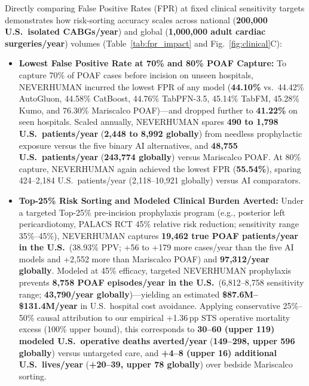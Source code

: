 Directly comparing False Positive Rates (FPR) at fixed clinical sensitivity targets demonstrates how risk-sorting accuracy scales across national (\textbf{200,000 U.S.\ isolated CABGs/year}) and global (\textbf{1,000,000 adult cardiac surgeries/year}\cite{vervoort2023global}) volumes (Table~\ref{tab:fpr_impact} and Fig.~\ref{fig:clinical}C):
\begin{itemize}
  \item \textbf{Lowest False Positive Rate at 70\% and 80\% POAF Capture:} To capture 70\% of POAF cases before incision on unseen hospitals, NEVERHUMAN incurred the lowest FPR of any model (\textbf{44.10\%} vs.\ 44.42\% AutoGluon, 44.58\% CatBoost, 44.76\% TabPFN-3.5, 45.14\% TabFM, 45.28\% Kumo, and 76.30\% Mariscalco POAF)---and dropped further to \textbf{41.22\%} on seen  hospitals. Scaled annually, NEVERHUMAN spares \textbf{490 to 1,798 U.S.\ patients/year} (\textbf{2,448 to 8,992 globally}) from needless prophylactic exposure versus the five binary AI alternatives, and \textbf{48,755 U.S.\ patients/year} (\textbf{243,774 globally}) versus Mariscalco POAF. At 80\% capture, NEVERHUMAN again achieved the lowest FPR (\textbf{55.54\%}), sparing 424--2,184 U.S.\ patients/year (2,118--10,921 globally) versus AI comparators.
  \item \textbf{Top-25\% Risk Sorting and Modeled Clinical Burden Averted:} Under a targeted Top-25\% pre-incision prophylaxis program (e.g., posterior left pericardiotomy, PALACS RCT 45\% relative risk reduction;\cite{gaudino2021palacs} sensitivity range 35\%--45\%), NEVERHUMAN captures \textbf{19,462 true POAF patients/year in the U.S.}\ (38.93\% PPV; +56 to +179 more cases/year than the five AI models and +2,552 more than Mariscalco POAF) and \textbf{97,312/year globally}. Modeled at 45\% efficacy, targeted NEVERHUMAN prophylaxis prevents \textbf{8,758 POAF episodes/year in the U.S.}\ (6,812--8,758 sensitivity range; \textbf{43,790/year globally})---yielding an estimated \textbf{\$87.6M--\$131.4M/year} in U.S.\ hospital cost avoidance.\cite{lapar2014poaf} Applying conservative 25\%--50\% causal attribution to our empirical +1.36\,pp STS operative mortality excess (100\% upper bound), this corresponds to \textbf{30--60 (upper 119) modeled U.S.\ operative deaths averted/year} (\textbf{149--298, upper 596 globally}) versus untargeted care, and \textbf{+4--8 (upper 16) additional U.S.\ lives/year} (\textbf{+20--39, upper 78 globally}) over bedside Mariscalco sorting.
\end{itemize}


